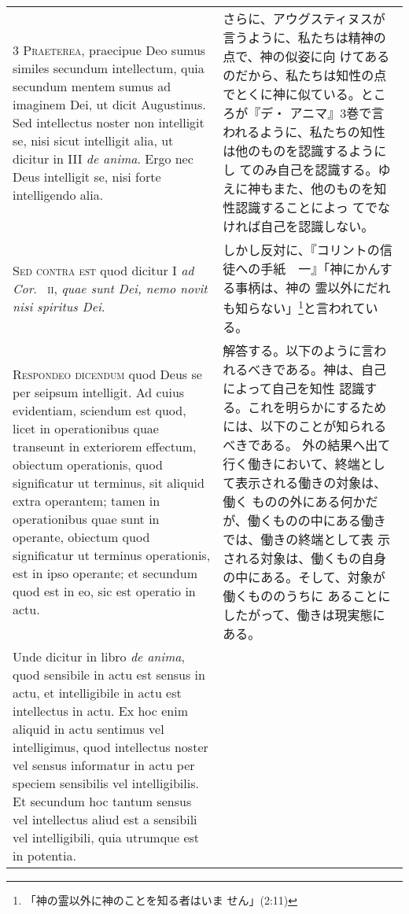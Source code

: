 \documentclass[10pt]{jsarticle} %
\begin{document}
\begin{longtable}{p{21em}p{21em}}
{\scshape 3 Praeterea}, praecipue Deo sumus similes secundum
intellectum, quia secundum mentem sumus ad imaginem Dei, ut dicit
Augustinus. Sed intellectus noster non intelligit se, nisi sicut
intelligit alia, ut dicitur in III {\itshape de anima}. Ergo nec Deus
intelligit se, nisi forte intelligendo alia.


&

さらに、アウグスティヌスが言うように、私たちは精神の点で、神の似姿に向
けてあるのだから、私たちは知性の点でとくに神に似ている。ところが『デ・
アニマ』3巻で言われるように、私たちの知性は他のものを認識するようにし
てのみ自己を認識する。ゆえに神もまた、他のものを知性認識することによっ
てでなければ自己を認識しない。

\\


{\scshape Sed contra est} quod dicitur I {\itshape ad Cor}.~{\scshape
ii}, {\itshape quae sunt Dei, nemo novit nisi spiritus Dei}.

&

しかし反対に、『コリントの信徒への手紙　一』「神にかんする事柄は、神の
霊以外にだれも知らない」\footnote{「神の霊以外に神のことを知る者はいま
せん」(2:11)}と言われている。

\\

{\scshape Respondeo dicendum} quod Deus se per seipsum intelligit. Ad
cuius evidentiam, sciendum est quod, licet in operationibus quae
transeunt in exteriorem effectum, obiectum operationis, quod
significatur ut terminus, sit aliquid extra operantem; tamen in
operationibus quae sunt in operante, obiectum quod significatur ut
terminus operationis, est in ipso operante; et secundum quod est in
eo, sic est operatio in actu.

&

解答する。以下のように言われるべきである。神は、自己によって自己を知性
認識する。これを明らかにするためには、以下のことが知られるべきである。
外の結果へ出て行く働きにおいて、終端として表示される働きの対象は、働く
ものの外にある何かだが、働くものの中にある働きでは、働きの終端として表
示される対象は、働くもの自身の中にある。そして、対象が働くもののうちに
あることにしたがって、働きは現実態にある。


\\


Unde dicitur in libro {\itshape de anima}, quod sensibile in actu est
sensus in actu, et intelligibile in actu est intellectus in actu. Ex
hoc enim aliquid in actu sentimus vel intelligimus, quod intellectus
noster vel sensus informatur in actu per speciem sensibilis vel
intelligibilis. Et secundum hoc tantum sensus vel intellectus aliud
est a sensibili vel intelligibili, quia utrumque est in potentia.


\end{longtable}
\end{document}

